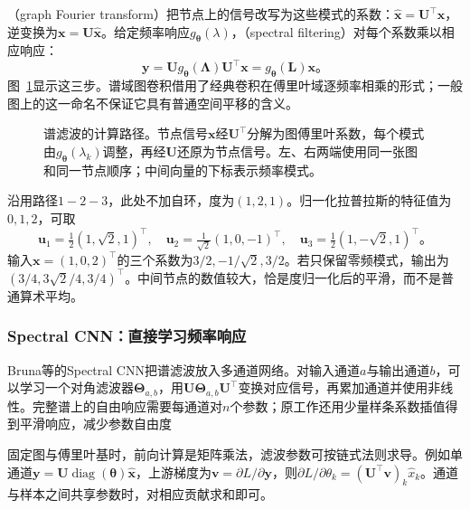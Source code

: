 （graph Fourier transform）把节点上的信号改写为这些模式的系数：$\widehat{\bm{x}}=\bm{U}^{\top}\bm{x}$，逆变换为$\bm{x}=\bm{U}\widehat{\bm{x}}$。给定频率响应$g_{\bm{\theta}}(\lambda)$，（spectral filtering）对每个系数乘以相应响应：
\begin{equation}
  \bm{y}=\bm{U}g_{\bm{\theta}}(\bm{\Lambda})\bm{U}^{\top}\bm{x}
    =g_{\bm{\theta}}(\bm{L})\bm{x}\text{。}
  \label{eq:gnn-spectral-filter}
\end{equation}
图~\ref{fig:gnn-spectral-filter}显示这三步。谱域图卷积借用了经典卷积在傅里叶域逐频率相乘的形式；一般图上的这一命名不保证它具有普通空间平移的含义。

\begin{figure}[htb]
  \centering
  
  \caption{谱滤波的计算路径。节点信号$\bm{x}$经$\bm{U}^{\top}$分解为图傅里叶系数，每个模式由$g_{\bm{\theta}}(\lambda_k)$调整，再经$\bm{U}$还原为节点信号。左、右两端使用同一张图和同一节点顺序；中间向量的下标表示频率模式。}
  \label{fig:gnn-spectral-filter}
\end{figure}

\begin{example}[三节点路径上的低频模式]
\label{ex:gnn-low-frequency}
沿用路径$1-2-3$，此处不加自环，度为$(1,2,1)$。归一化拉普拉斯的特征值为$0,1,2$，可取
\[
  \bm{u}_1=\tfrac12(1,\sqrt2,1)^{\top},\quad
  \bm{u}_2=\tfrac{1}{\sqrt2}(1,0,-1)^{\top},\quad
  \bm{u}_3=\tfrac12(1,-\sqrt2,1)^{\top}\text{。}
\]
输入$\bm{x}=(1,0,2)^{\top}$的三个系数为$3/2,-1/\sqrt2,3/2$。若只保留零频模式，输出为$(3/4,3\sqrt2/4,3/4)^{\top}$。中间节点的数值较大，恰是度归一化后的平滑，而不是普通算术平均。
\end{example}

\subsubsection{Spectral CNN：直接学习频率响应}
\label{sec:gnn-spectral-cnn}

Bruna等的Spectral CNN把谱滤波放入多通道网络。对输入通道$a$与输出通道$b$，可以学习一个对角滤波器$\bm{\Theta}_{a,b}$，用$\bm{U}\bm{\Theta}_{a,b}\bm{U}^{\top}$变换对应信号，再累加通道并使用非线性。完整谱上的自由响应需要每通道对$n$个参数；原工作还用少量样条系数插值得到平滑响应，减少参数自由度

固定图与傅里叶基时，前向计算是矩阵乘法，滤波参数可按链式法则求导。例如单通道$\bm{y}=\bm{U}\operatorname{diag}(\bm{\theta})\widehat{\bm{x}}$，上游梯度为$\bm{v}=\partial L/\partial\bm{y}$，则$\partial L/\partial\theta_k=(\bm{U}^{\top}\bm{v})_k\widehat x_k$。通道与样本之间共享参数时，对相应贡献求和即可。


